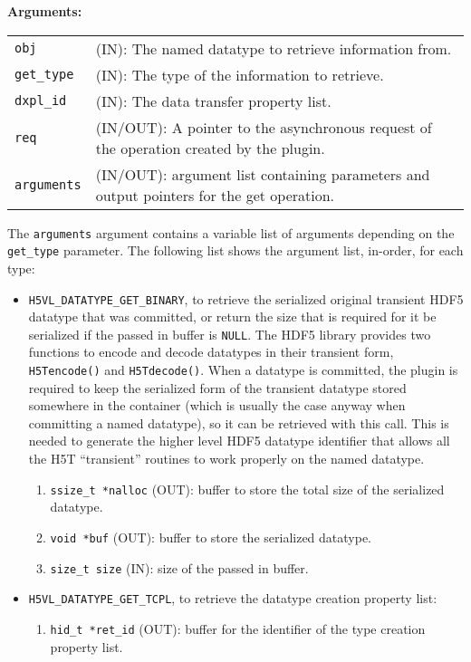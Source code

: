 \textbf{Arguments:}\\
\begin{tabular}{l p{10cm}}
  {\tt obj} & (IN): The named datatype to retrieve information from.\\
  {\tt get\_type} & (IN): The type of the information to retrieve.\\
  {\tt dxpl\_id} & (IN): The data transfer property list.\\
  {\tt req} & (IN/OUT): A pointer to the asynchronous request of the
  operation created by the plugin.\\
  {\tt arguments} & (IN/OUT): argument list containing parameters and
  output pointers for the get operation. \\
\end{tabular}

The {\tt arguments} argument contains a variable list of arguments
depending on the {\tt get\_type} parameter. The following list shows
the argument list, in-order, for each type:

\begin{itemize}
\item {\tt H5VL\_DATATYPE\_GET\_BINARY}, to retrieve the serialized original transient HDF5 datatype that was committed, or
return the size that is required for it be serialized if the passed in buffer is {\tt NULL}. The HDF5 library provides two functions to
encode and decode datatypes in their transient form, {\tt H5Tencode()} and {\tt H5Tdecode()}. When a datatype is committed, the plugin is required to keep the serialized form of the transient datatype stored somewhere in the container (which is usually the case anyway when committing a named datatype), so it can be retrieved with this call. This is needed to generate the higher level HDF5 datatype identifier that allows all the H5T ``transient'' routines to work properly on the named datatype.
  \begin{enumerate}
  \item {\tt ssize\_t *nalloc} (OUT): buffer to store the total size of the serialized datatype.
  \item {\tt void *buf} (OUT): buffer to store the serialized datatype.
  \item {\tt size\_t size} (IN): size of the passed in buffer.
  \end{enumerate}
  
\item {\tt H5VL\_DATATYPE\_GET\_TCPL}, to retrieve the datatype
  creation property list:
  \begin{enumerate}
  \item {\tt hid\_t *ret\_id} (OUT): buffer for the identifier of the
    type creation property list.
  \end{enumerate}
\end{itemize}

